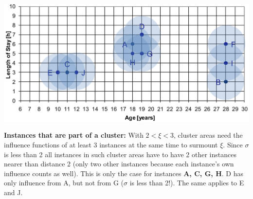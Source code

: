 \begin{breakbox}
\begin{center}
	\includegraphics[width=.15\textwidth]{slides_images/denclue_cluster}
\end{center}

\textbf{Instances that are part of a cluster:}
With $2 < \xi < 3$, cluster areas need the influence functions of at least 3 instances at the same time to surmount $\xi$. Since $\sigma$ is less than 2 all instances in such cluster areas have to have 2 other instances nearer than distance 2 (only two other instances because each instance's own influence counts as well). This is only the case for instances \textbf{A, C, G, H}. D has only influence from A, but not from G ($\sigma$ is less than 2!). The same applies to E and J.
\end{breakbox}	
